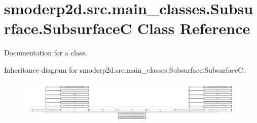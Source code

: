 \hypertarget{classsmoderp2d_1_1src_1_1main__classes_1_1Subsurface_1_1SubsurfaceC}{\section{smoderp2d.\-src.\-main\-\_\-classes.\-Subsurface.\-Subsurface\-C Class Reference}
\label{classsmoderp2d_1_1src_1_1main__classes_1_1Subsurface_1_1SubsurfaceC}
}


Documentation for a class.  


Inheritance diagram for smoderp2d.\-src.\-main\-\_\-classes.\-Subsurface.\-Subsurface\-C\-:\begin{figure}[H]
\begin{center}
\leavevmode
\includegraphics[height=2.123894cm]{d2/d01/classsmoderp2d_1_1src_1_1main__classes_1_1Subsurface_1_1SubsurfaceC}
\end{center}
\end{figure}
